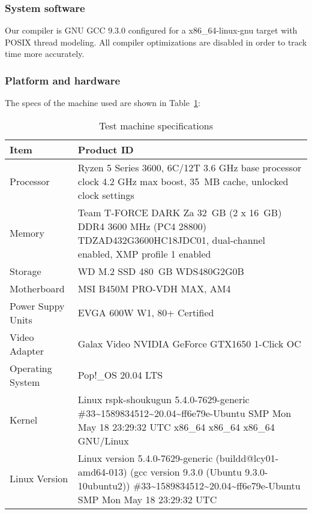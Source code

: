 \subsubsection{System software}
Our compiler is GNU GCC 9.3.0 configured for a x86\_64-linux-gnu target with POSIX thread modeling. All compiler optimizations are disabled in order to track time more accurately.
\subsubsection{Platform and hardware}
The specs of the machine used are shown in Table~\ref{TABLE:SPECS}:\\

\begin{table}[!ht]
    \centering
    \caption{Test machine specifications}
    \begin{tabularx}{\linewidth}{|l|X|}
        \hline
        Item & Product ID \\
        \hline
        Processor  & Ryzen 5 Series 3600, 6C/12T 3.6 GHz base processor clock 4.2 GHz max boost, 35 MB cache, unlocked clock settings \\
        \hline
        Memory  & Team T-FORCE DARK Za 32 GB (2 x 16 GB) DDR4 3600 MHz (PC4 28800) TDZAD432G3600HC18JDC01, dual-channel enabled, XMP profile 1 enabled\\
        \hline
        Storage  & WD M.2 SSD 480 GB WDS480G2G0B \\
        \hline
        Motherboard  & MSI B450M PRO-VDH MAX, AM4 \\
        \hline
        Power Suppy Units  & EVGA 600W W1, 80+ Certified\\
        \hline
        Video Adapter  &  Galax Video NVIDIA GeForce GTX1650 1-Click OC  \\
        \hline
        Operating System  &  Pop!\_OS 20.04 LTS  \\
        \hline
        Kernel  &  Linux rspk-shoukugun 5.4.0-7629-generic \#33\~{}1589834512\~{}20.04\~{}ff6e79e-Ubuntu SMP Mon May 18 23:29:32 UTC  x86\_64 x86\_64 x86\_64 GNU/Linux\\
        \hline
        Linux Version  & Linux version 5.4.0-7629-generic (buildd@lcy01-amd64-013) (gcc version 9.3.0 (Ubuntu 9.3.0-10ubuntu2)) \#33\~{}1589834512\~{}20.04\~{}ff6e79e-Ubuntu SMP Mon May 18 23:29:32 UTC \\ 
        \hline
    \end{tabularx}    
    \label{TABLE:SPECS}
\end{table}
\FloatBarrier